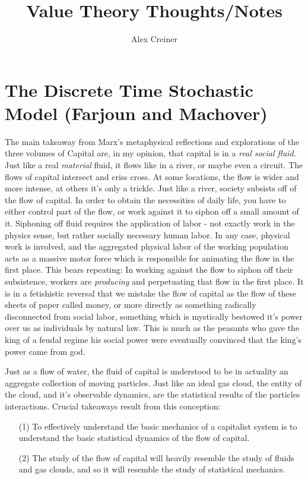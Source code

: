 \documentclass{article}
\title{Value Theory Thoughts/Notes}
\author{Alex Creiner}
\theoremstyle{definition}
\theoremstyle{plain}
\theoremstyle{theorem}
\begin{document}
\maketitle
\section{The Discrete Time Stochastic Model (Farjoun and Machover)}
The main takeaway from Marx's metaphysical reflections and explorations of the three volumes of Capital are, in my opinion, that capital is in a \emph{real social fluid}. 
Just like a real \emph{material} fluid, it flows like in a river, or maybe even a circuit. The flows of capital intersect and criss cross. At some locations, the flow is wider and more intense, at others it's only a trickle. Just like a river, society subsists off of the flow of capital. In order to obtain the necessities of daily life, you have to either control part of the flow, or work against it to siphon off a small amount of it. Siphoning off fluid requires the application of labor - not exactly work in the physics sense, but rather socially necessary human labor. In any case, physical work is involved, and the aggregated physical labor of the working population acts as a massive motor force which is responsible for animating the flow in the first place. This bears repeating: In working against the flow to siphon off their subsistence, workers are \emph{producing} and perpetuating that flow in the first place. It is in a fetishistic reversal that we mistake the flow of capital as the flow of these sheets of paper called money, or more directly as something radically disconnected from social labor, something which is mystically bestowed it's power over us as individuals by natural law. This is much as the peasants who gave the king of a feudal regime his social power were eventually convinced that the king's power came from god. \par 
Just as a flow of water, the fluid of capital is understood to be in actuality an aggregate collection of moving particles. Just like an ideal gas cloud, the entity of the cloud, and it's observable dynamics, are the statistical results of the particles interactions. Crucial takeaways result from this conception:
\begin{itemize}
	\item[(1)] To effectively understand the basic mechanics of a capitalist system is to understand the basic statistical dynamics of the flow of capital.
	\item[(2)] The study of the flow of capital will heavily resemble the study of fluids and gas clouds, and so it will resemble the study of statistical mechanics.
\end{itemize}
\end{document}
